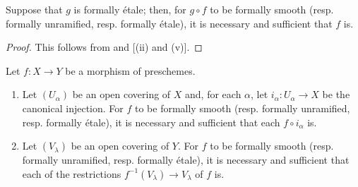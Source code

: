 \begin{corollary}[17.1.5]
\label{IV.17.1.5}
Suppose that $g$ is formally \'etale;
then, for $g\circ f$ to be formally smooth (resp. formally unramified, resp. formally \'etale), it is necessary and sufficient that $f$ is.
\end{corollary}

\begin{proof}
This follows from  and [(ii) and (v)].
\end{proof}

\begin{proposition}[17.1.6]
\label{IV.17.1.6}
Let $f:X\to Y$ be a morphism of preschemes.
\begin{enumerate}
  \item[{\rm(i)}] Let $(U_\alpha)$ be an open covering of $X$ and, for each $\alpha$, let $i_\alpha:U_\alpha\to X$ be the canonical injection.
    For $f$ to be formally smooth (resp. formally unramified, resp. formally \'etale), it is necessary and sufficient that each $f\circ i_\alpha$ is.
  \item[{\rm(ii)}] Let $(V_\lambda)$ be an open covering of $Y$.
    For $f$ to be formally smooth (resp. formally unramified, resp. formally \'etale), it is necessary and sufficient that each of the restrictions $f^{-1}(V_\lambda)\to V_\lambda$ of $f$ is.
\end{enumerate}
\end{proposition}

